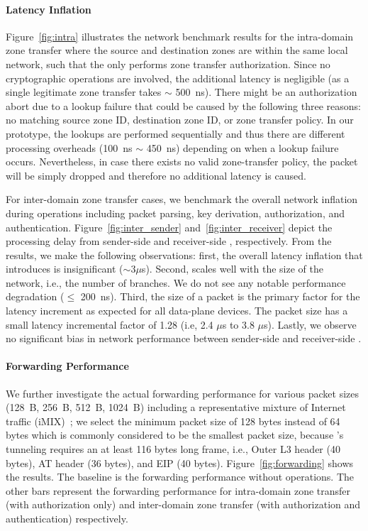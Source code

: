 \paragraph{Latency Inflation}
Figure~\ref{fig:intra} illustrates the network benchmark results for the intra-domain zone
transfer where the source and destination zones are within the same local network, such that
the \tp only performs zone transfer authorization. Since no cryptographic operations are involved,
the additional latency is negligible (as a single legitimate zone transfer takes $\sim$
\SI{500}{ns}). There might be an authorization abort due to a lookup failure that could be
caused by the following three reasons: no matching source zone ID, destination zone ID, or
zone transfer policy. In our prototype, the lookups are performed sequentially and thus
there are different processing overheads (\SI{100}{ns} $\sim$ \SI{450}{ns}) depending on when a
lookup failure occurs. Nevertheless, in case there exists no valid zone-transfer policy, the
packet will be simply dropped and therefore no additional latency is caused.

For inter-domain zone transfer cases, we benchmark the overall network inflation during \tp
operations including packet parsing, key derivation, authorization, and authentication.
Figure~\ref{fig:inter_sender} and~\ref{fig:inter_receiver} depict the processing delay from
sender-side \tp and receiver-side \tp, respectively.
From the results, we make the following observations: first, the overall latency inflation that
\name introduces is insignificant ($\sim 3 \mu$s). Second, \name scales well with the size of the
network, i.e., the number of branches. We do not see any notable performance degradation
($\leq$ \SI{200}{ns}). Third, the size of a packet is the primary factor for the latency increment
as expected for all data-plane devices. The packet size has a small latency incremental factor of
1.28 (i.e, 2.4 $\mu$s to 3.8 $\mu$s). Lastly, we observe no significant bias in network
performance between sender-side and receiver-side \tps.


\paragraph{Forwarding Performance}
We further investigate the actual forwarding performance for various packet sizes (\SI{128}{B},
\SI{256}{B}, \SI{512}{B}, \SI{1024}{B}) including a representative mixture of Internet traffic
(iMIX)~\cite{rfc6985}; we select the minimum packet size of 128 bytes instead of 64 bytes which is
commonly considered to be the smallest packet size, because \name's tunneling requires an at least 116
bytes long frame, i.e., Outer L3 header (40 bytes), AT header
(36 bytes), and EIP (40 bytes). Figure~\ref{fig:forwarding} shows the results. The
baseline is the forwarding performance without \tp operations. The other bars represent the
forwarding performance for intra-domain zone transfer (with authorization only) and inter-domain
zone transfer (with authorization and authentication) respectively.

